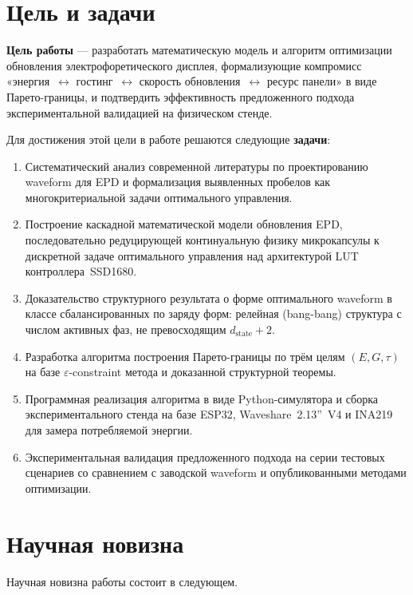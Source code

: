 \section*{Цель и задачи}

\textbf{Цель работы} — разработать математическую модель и алгоритм
оптимизации обновления электрофоретического дисплея, формализующие
компромисс «энергия~$\leftrightarrow$ гостинг~$\leftrightarrow$ скорость
обновления~$\leftrightarrow$ ресурс панели» в виде
Парето\nobreakdash-границы, и подтвердить эффективность предложенного подхода
экспериментальной валидацией на физическом стенде.

Для достижения этой цели в работе решаются следующие \textbf{задачи}:
\begin{enumerate}
    \item Систематический анализ современной литературы по проектированию
    waveform для EPD и формализация выявленных пробелов как
    многокритериальной задачи оптимального управления.
    \item Построение каскадной математической модели обновления EPD,
    последовательно редуцирующей континуальную физику микрокапсулы к
    дискретной задаче оптимального управления над архитектурой LUT
    контроллера~SSD1680.
    \item Доказательство структурного результата о форме оптимального
    waveform в классе сбалансированных по заряду форм: релейная (bang-bang)
    структура с числом активных фаз, не превосходящим $d_{\mathrm{state}} + 2$.
    \item Разработка алгоритма построения Парето-границы по трём целям
    $(E, G, \tau)$ на базе $\varepsilon$-constraint метода и доказанной
    структурной теоремы.
    \item Программная реализация алгоритма в виде Python-симулятора и сборка
    экспериментального стенда на базе ESP32, Waveshare~2.13''~V4 и INA219
    для замера потребляемой энергии.
    \item Экспериментальная валидация предложенного подхода на серии
    тестовых сценариев со сравнением с заводской waveform и опубликованными
    методами оптимизации.
\end{enumerate}


\section*{Научная новизна}

Научная новизна работы состоит в следующем.

